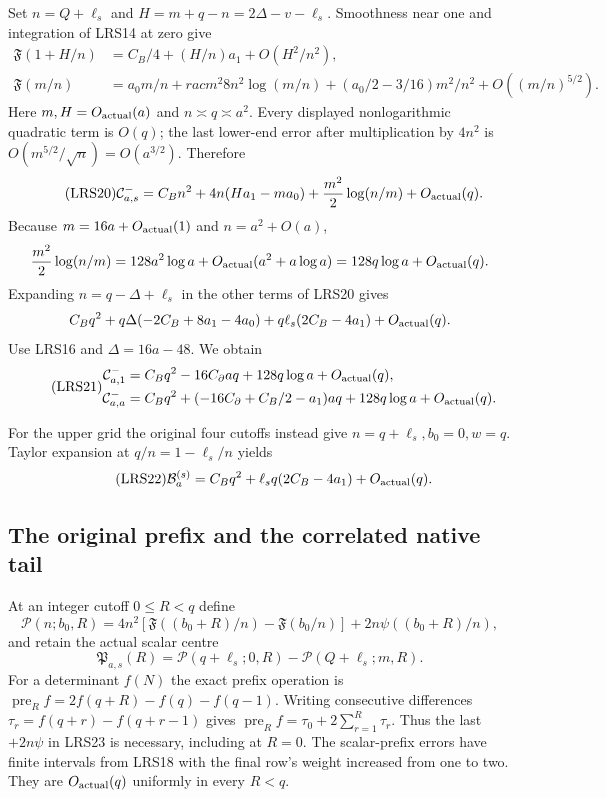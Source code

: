 Set $n=Q+\ell_s$ and $H=m+q-n=2\Delta-v-\ell_s$.
Smoothness near one and integration of LRS14 at zero give
\[
\begin{split}
 \mathfrak F(1+H/n)&=C_B/4+(H/n)a_1+O(H^2/n^2),\\
 \mathfrak F(m/n)&=a_0m/n+rac{m^2}{8n^2}\log(m/n)
                  +(a_0/2-3/16)m^2/n^2+O((m/n)^{5/2}).
\end{split}
\]
Here $m,H=O_{\rm actual}(a)$ and $n\asymp q\asymp a^2$.
Every displayed nonlogarithmic quadratic term is $O(q)$; the
last lower-end error after multiplication by $4n^2$ is
$O(m^{5/2}/\sqrt n)=O(a^{3/2})$.  Therefore
\begin{equation}\tag{LRS20}
 \mathcal C^-_{a,s}=C_Bn^2+4n(Ha_1-ma_0)
                    +\frac{m^2}{2}\log(n/m)+O_{\rm actual}(q).
\end{equation}
Because $m=16a+O_{\rm actual}(1)$ and $n=a^2+O(a)$,
\[
 \frac{m^2}{2}\log(n/m)
 =128a^2\log a+O_{\rm actual}(a^2+a\log a)
 =128q\log a+O_{\rm actual}(q).
\]
Expanding $n=q-\Delta+\ell_s$ in the other terms of LRS20 gives
\[
 C_Bq^2+q\Delta(-2C_B+8a_1-4a_0)
            +q\ell_s(2C_B-4a_1)+O_{\rm actual}(q).
\]
Use LRS16 and $\Delta=16a-48$.  We obtain
\begin{equation}\tag{LRS21}
\begin{split}
 \mathcal C^-_{a,1}
 &=C_Bq^2-16C_\partial aq+128q\log a+O_{\rm actual}(q),\\
 \mathcal C^-_{a,a}
 &=C_Bq^2+(-16C_\partial+C_B/2-a_1)aq
                +128q\log a+O_{\rm actual}(q).
\end{split}
\end{equation}

For the upper grid the original four cutoffs instead give
$n=q+\ell_s,b_0=0,w=q$.  Taylor expansion at
$q/n=1-\ell_s/n$ yields
\begin{equation}\tag{LRS22}
 \mathcal B_a^{(s)}=C_Bq^2+\ell_sq(2C_B-4a_1)
                         +O_{\rm actual}(q).
\end{equation}

\subsection{The original prefix and the correlated native tail}

At an integer cutoff $0\le R<q$ define
\[
 \mathscr P(n;b_0,R)=4n^2[
  \mathfrak F((b_0+R)/n)-\mathfrak F(b_0/n)]
       +2n\psi((b_0+R)/n),
\]
and retain the actual scalar centre
\begin{equation}\tag{LRS23}
 \mathfrak P_{a,s}(R)=\mathscr P(q+\ell_s;0,R)
                    -\mathscr P(Q+\ell_s;m,R).
\end{equation}
For a determinant $f(N)$ the exact prefix operation is
$\operatorname{pre}_Rf=2f(q+R)-f(q)-f(q-1)$.
Writing consecutive differences $\tau_r=f(q+r)-f(q+r-1)$ gives
$\operatorname{pre}_Rf=\tau_0+2\sum_{r=1}^R\tau_r$.
Thus the last $+2n\psi$ in LRS23 is necessary, including at $R=0$.
The scalar-prefix errors have finite intervals from LRS18 with
the final row's weight increased from one to two.  They are
$O_{\rm actual}(q)$ uniformly in every $R<q$.

